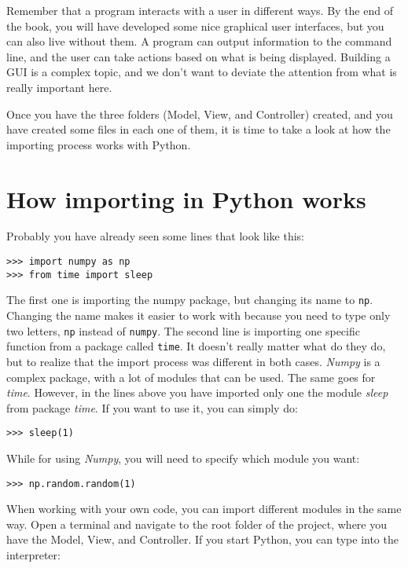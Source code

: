 Remember that a program interacts with a user in different ways. By the
end of the book, you will have developed some nice graphical user
interfaces, but you can also live without them. A program can output
information to the command line, and the user can take actions based on
what is being displayed. Building a {GUI} is a complex topic, and we
don't want to deviate the attention from what is really important here.

Once you have the three folders (Model, View, and Controller) created,
and you have created some files in each one of them, it is time to take
a look at how the importing process works with Python.

\hypertarget{how-importing-in-python-works}{}
\section{How importing in
Python works}\label{how-importing-in-pythonworks}

Probably you have already seen some lines that look like this:

\begin{verbatim}
>>> import numpy as np
>>> from time import sleep
\end{verbatim}

The first one is importing the numpy package, but changing its name to
\texttt{np}. Changing the name makes it easier to work with because you
need to type only two letters, \texttt{np} instead of \texttt{numpy}.
The second line is importing one specific function from a package called
\texttt{time}. It doesn't really matter what do they do, but to realize
that the import process was different in both cases. \emph{Numpy} is a
complex package, with a lot of modules that can be used. The same goes
for \emph{time}. However, in the lines above you have imported only one
the module \emph{sleep} from package \emph{time}. If you want to use it,
you can simply do:

\begin{verbatim}
>>> sleep(1)
\end{verbatim}

While for using \emph{Numpy}, you will need to specify which module
you want:

\begin{verbatim}
>>> np.random.random(1)
\end{verbatim}

When working with your own code, you can import different modules in the
same way. Open a terminal and navigate to the root folder of the
project, where you have the Model, View, and Controller. If you start
Python, you can type into the interpreter:


